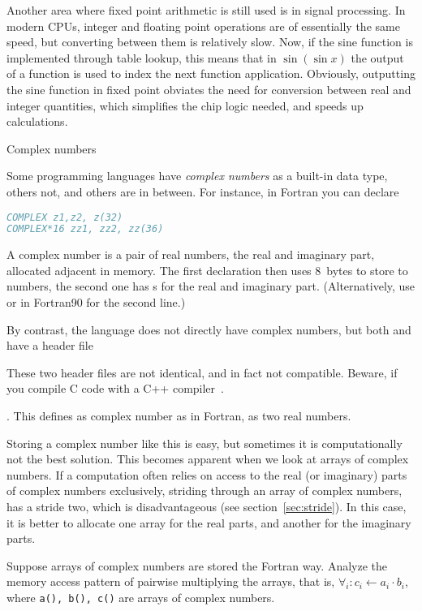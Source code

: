 Another area where fixed point arithmetic is still used is in signal
processing. In modern CPUs, integer and floating point operations
are of essentially the same speed, but converting between them is
relatively slow. Now, if the sine function is implemented through
table lookup, this means that in $\sin(\sin x)$ 
the output of a function is used to index the next function
application. Obviously, outputting the sine function in fixed point
obviates the need for conversion between real and integer quantities,
which simplifies the chip logic needed, and speeds up calculations.

 {Complex numbers}
\label{sec:complex}

Some programming languages have \emph{complex numbers} as a built-in data type,
others not, and others are in between. For instance, in Fortran you
can declare
\begin{lstlisting}[language=Fortran]
COMPLEX z1,z2, z(32)
COMPLEX*16 zz1, zz2, zz(36)
\end{lstlisting}
A complex number is a pair of real numbers, the real and imaginary
part, allocated adjacent in memory. The first declaration then uses
8~bytes to store to  numbers, the second one has s
for the real and imaginary part.  (Alternatively, use  or in Fortran90  for the second line.)

By contrast, the  language does not directly have complex
numbers, but both  and  have a  header
file
\begin{footnoteenv}
  {These two header files are not identical, and in fact
  not compatible. Beware, if you compile C code with a C++
  compiler~\cite{DobbsComplex}.}
\end{footnoteenv}
. This defines as complex number as in
Fortran, as two real numbers.

Storing a complex number like this is easy, but sometimes it is
computationally not the best solution. This becomes apparent when we
look at arrays of complex numbers.
If a computation often relies
on access to the real (or imaginary) parts of complex numbers
exclusively, striding through an array of complex numbers, has a
stride two, which is disadvantageous (see
section~\ref{sec:stride}). In this case, it is better to allocate one
array for the real parts, and another for the imaginary parts.

\begin{exercise}
  Suppose arrays of complex numbers are stored the Fortran
  way. Analyze the memory access pattern of pairwise multiplying the
  arrays, that is, $\forall_i\colon c_i\leftarrow a_i\cdot b_i$, where
  \texttt{a(), b(), c()} are arrays of complex numbers.
\end{exercise}


